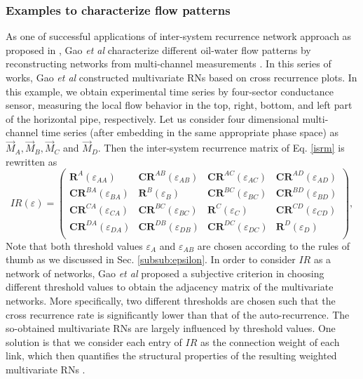 		\subsubsection{Examples to characterize flow patterns}		
		As one of successful applications of inter-system recurrence network approach as proposed in \cite{Feldhoff2011,Feldhoff2012}, Gao {\textit{et al}} characterize different oil-water flow patterns by reconstructing networks from multi-channel measurements \cite{Gao2013,Gao2016b,Gao2016c}. In this series of works, Gao {\textit{et al}} constructed multivariate RNs based on cross recurrence plots. In this example, we obtain experimental time series by four-sector conductance sensor, measuring the local flow behavior in the top, right, bottom, and left part of the horizontal pipe, respectively. Let us consider four dimensional multi-channel time series (after embedding in the same appropriate phase space) as $\vec{M}_A, \vec{M}_B, \vec{M}_C$ and $\vec{M}_D$. Then the inter-system recurrence matrix of Eq. \eqref{isrm} is rewritten as 
		\begin{equation} IR(\varepsilon) = \left( \begin{array}{cccc}
\mathbf{R}^{A}(\varepsilon_{AA}) & \mathbf{CR}^{AB}(\varepsilon_{AB}) & \mathbf{CR}^{AC}(\varepsilon_{AC})  & \mathbf{CR}^{AD}(\varepsilon_{AD}) \\
\mathbf{CR}^{BA}(\varepsilon_{BA}) & \mathbf{R}^{B}(\varepsilon_{B}) & \mathbf{CR}^{BC}(\varepsilon_{BC})  & \mathbf{CR}^{BD}(\varepsilon_{BD}) \\
\mathbf{CR}^{CA}(\varepsilon_{CA}) & \mathbf{CR}^{BC}(\varepsilon_{BC}) & \mathbf{R}^{C}(\varepsilon_{C})  & \mathbf{CR}^{CD}(\varepsilon_{CD}) \\
\mathbf{CR}^{DA}(\varepsilon_{DA}) & \mathbf{CR}^{DB}(\varepsilon_{DB}) & \mathbf{CR}^{DC}(\varepsilon_{DC})  & \mathbf{R}^{D}(\varepsilon_{D}) \\
\end{array} \right), 
		\end{equation}
		Note that both threshold values $\varepsilon_{A}$ and $\varepsilon_{AB}$ are chosen according to the rules of thumb as we discussed in Sec. \ref{subsub:epsilon}. In order to consider $IR$ as a network of networks, Gao {\textit{et al}} \cite{Gao2013} proposed a subjective criterion in choosing different threshold values to obtain the adjacency matrix of the multivariate networks. More specifically, two different thresholds are chosen such that the cross recurrence rate is significantly lower than that of the auto-recurrence. The so-obtained multivariate RNs are largely influenced by threshold values. One solution is that we consider each entry of $IR$ as the connection weight of each link, which then quantifies the structural properties of the resulting weighted multivariate RNs \cite{Gao2016b}. 		

